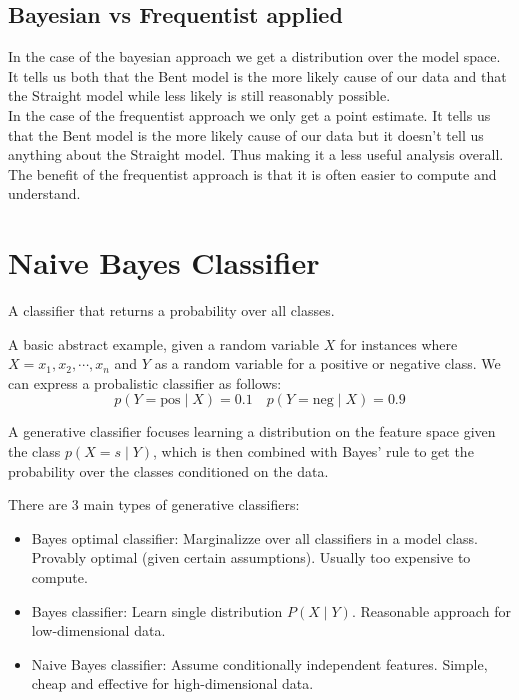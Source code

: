 \documentclass[12pt]{article}
\begin{document}
\subsection{Bayesian vs Frequentist applied}

In the case of the bayesian approach we get a distribution over the model space. It tells us both that the Bent model is the more likely cause of our data and that the Straight model while less likely is still reasonably possible. \\
In the case of the frequentist approach we only get a point estimate. It tells us that the Bent model is the more likely cause of our data but it doesn't tell us anything about the Straight model. Thus making it a less useful analysis overall. The benefit of the frequentist approach is that it is often easier to compute and understand.

\section{Naive Bayes Classifier}

\begin{definition}
    A classifier that returns a probability over all classes.
\end{definition}

A basic abstract example, given a random variable $X$ for instances where $X=x_1, x_2, \cdots, x_n$ and $Y$ as a random variable for a positive or negative class. We can express a probalistic classifier as follows: 
\[
    p(Y=\text{pos}\mid X) = 0.1 \quad p(Y=\text{neg}\mid X) = 0.9  
\]

\begin{definition}
    A generative classifier focuses learning a distribution on the feature space given the class $p(X=s\mid Y)$, which is then combined with Bayes' rule to get the probability over the classes conditioned on the data.
\end{definition}

There are 3 main types of generative classifiers:
\begin{itemize}[leftmargin=*, noitemsep]
    \item Bayes optimal classifier: Marginalizze over all classifiers in a model class. Provably optimal (given certain assumptions). Usually too expensive to compute.
    \item Bayes classifier: Learn single distribution $P(X\mid Y)$. Reasonable approach for low-dimensional data.
    \item Naive Bayes classifier: Assume conditionally independent features. Simple, cheap and effective for high-dimensional data.
\end{itemize}
\end{document}
